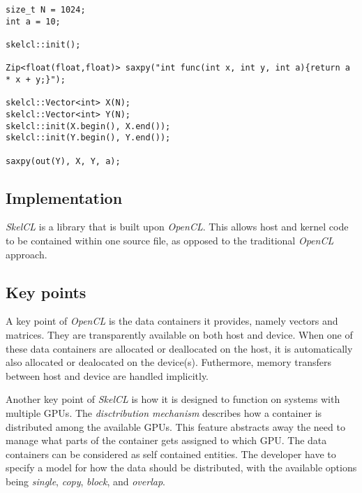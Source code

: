 \begin{lstlisting}[caption={The \textit{SAXPY} computation in \textit{SkelCL}.}, label=code:skelclSample] 
size_t N = 1024;
int a = 10;

skelcl::init();

Zip<float(float,float)> saxpy("int func(int x, int y, int a){return a * x + y;}");

skelcl::Vector<int> X(N);      
skelcl::Vector<int> Y(N);
skelcl::init(X.begin(), X.end()); 
skelcl::init(Y.begin(), Y.end());

saxpy(out(Y), X, Y, a);
\end{lstlisting}

\subsection{Implementation}
\textit{SkelCL} is a library that is built upon \textit{OpenCL}. This allows host and kernel code to be contained within one source file, as opposed to the traditional \textit{OpenCL} approach.

\subsection{Key points}
A key point of \textit{OpenCL} is the data containers it provides, namely vectors and matrices. They are transparently available on both host and device. When one of these data containers are allocated or deallocated on the host, it is automatically also allocated or dealocated on the device(s). Futhermore, memory transfers between host and device are handled implicitly.

Another key point of \textit{SkelCL} is how it is designed to function on systems with multiple GPUs. The \textit{disctribution mechanism} describes how a container is distributed among the available GPUs. This feature abstracts away the need to manage what parts of the container gets assigned to which GPU. The data containers can be considered as self contained entities. The developer have to specify a model for how the data should be distributed, with the available options being \textit{single}, \textit{copy}, \textit{block}, and \textit{overlap}.
